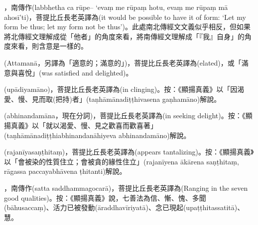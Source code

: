 \startitemgroup[noteitems]
\item{}，南傳作(labbhetha ca rūpe– ‘evaṃ me rūpaṃ hotu, evaṃ me rūpaṃ mā ahosī’ti)，菩提比丘長老英譯為(it would be possible to have it of form: ‘Let my form be thus; let my form not be thus’)。此處南北傳經文文義似乎相反，但如果將北傳經文理解成從「他者」的角度來看，將南傳經文理解成「『我』自身」的角度來看，則含意是一樣的。
\stopitemgroup

\startitemgroup[noteitems]
\item{}(Attamanā，另譯為「適意的；滿意的」)，菩提比丘長老英譯為(elated)，或「滿意與喜悅」(was satisfied and delighted)。
\stopitemgroup

\startitemgroup[noteitems]
\item{}(upādiyamāno)，菩提比丘長老英譯為(in clinging)。按：《顯揚真義》以「因渴愛、慢、見而取(把持)者」(taṇhāmānadiṭṭhivasena gaṇhamāno)解說。
\stopitemgroup

\startitemgroup[noteitems]
\item{}(abhinandamāna，現在分詞)，菩提比丘長老英譯為(in seeking delight)。按：《顯揚真義》以「就以渴愛、慢、見之歡喜而歡喜著」(taṇhāmānadiṭṭhiabhinandanāhiyeva abhinandamāno)解說。
\stopitemgroup

\startitemgroup[noteitems]
\item{}(rajanīyasaṇṭhitaṃ)，菩提比丘長老英譯為(appears tantalizing)。按：《顯揚真義》以「會被染的性質住立；會被貪的緣性住立」(rajanīyena ākārena saṇṭhitaṃ, rāgassa paccayabhāvena ṭhitanti)解說。
\stopitemgroup

\startitemgroup[noteitems]
\item{}，南傳作(satta saddhammagocarā)，菩提比丘長老英譯為(Ranging in the seven good qualities)。按：《顯揚真義》說，七善法為信、慚、愧、多聞(bāhusaccaṃ)、活力已被發動(āraddhavīriyatā)、念已現起(upaṭṭhitassatitā)、慧。
\stopitemgroup

